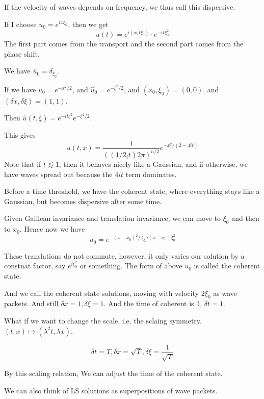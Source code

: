 If the velocity of waves depends on frequency, we thus call this dispersive.

If I choose $u_0=e^{ix\xi_0}$, then we get
\begin{equation*}
    u(t)=e^{i(x_2t\xi_0)}\cdot e^{-it\xi_0^2}
\end{equation*}
The first part comes from the transport and the second part comes from the phase shift.

We have $\widehat{u}_0=\delta_{\xi_0}$. 

If we have $u_0=e^{-x^2/2}$, and $\widehat{u}_0=e^{-\xi^2/2}$, and $(x_0, \xi_0)=(0,0)$, and $(\delta x, \delta \xi)=(1,1)$.

Then $\widehat{u}(t,\xi)=e^{-it\xi^2}e^{-\xi^2/2}$. 

This gives
\begin{equation*}
    u(t,x)=\frac{1}{((1/2_it)2\pi)^{n/2}}e^{-x^2/(2-4it)}
\end{equation*}
Note that if $t\lesssim 1$, then it behaves nicely like a Gaussian, and if otherwise, we have waves spread out because the $4it$ term dominates.

Before a time threshold, we have the coherent state, where everything stays like a Gaussian, but becomes dispersive after some time.

Given Galilean invariance and translation invariance, we can move to $\xi_0$ and then to $x_0$. Hence now we have
\begin{equation*}
    u_0=e^{-(x-x_0)^2/2}e^{i(x-x_0)\xi_0^2}
\end{equation*}

These translations do not commute, however, it only varies our solution by a constnat factor, say $e^{i\xi_0^2}$ or something. The form of above $u_0$ is called the coherent state.

And we call the coherent state solutions, moving with velocity $2\xi_0$ as wave packets. And still $\delta x=1, \delta\xi=1$. And the time of coherent is 1, $\delta t=1$.

What if we want to change the scale, i.e. the sclaing symmetry. $(t,x)\mapsto (\lambda^2 t, \lambda x)$.

\begin{equation*}
    \delta t=T, \delta x=\sqrt{T}, \delta\xi=\frac{1}{\sqrt{T}}
\end{equation*}

By this scaling relation, We can adjust the time of the coherent state.

We can also think of LS solutions as superpositions of wave packets.




